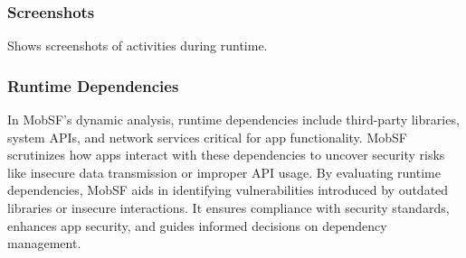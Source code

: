 \documentclass{report}
\begin{document}
\subsubsection{Screenshots}
Shows screenshots of activities during runtime.


\subsubsection{Runtime Dependencies}
In MobSF's dynamic analysis, runtime dependencies include third-party libraries, system APIs, and network services critical for app functionality. MobSF scrutinizes how apps interact with these dependencies to uncover security risks like insecure data transmission or improper API usage. By evaluating runtime dependencies, MobSF aids in identifying vulnerabilities introduced by outdated libraries or insecure interactions. It ensures compliance with security standards, enhances app security, and guides informed decisions on dependency management.
\end{document}
